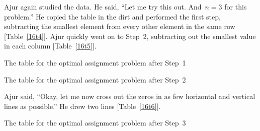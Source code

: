 Ajur again studied the data. He said, ``Let me try this out. And~$n=3$ for this problem.'' He copied the table in the dirt and performed the first step, subtracting the smallest element from every other element in the same row [Table~\ref{16t4}].
Ajur quickly went on to Step~2, subtracting out the smallest value in each column [Table~\ref{16t5}].

\begin{table}
\begin{center}

\caption{The table for the optimal assignment problem after Step~1}\label{16t4}
\end{center}
\end{table}

\begin{table}
\begin{center}

\caption{The table for the optimal assignment problem after Step~2}\label{16t5}
\end{center}
\end{table}

Ajur said, ``Okay, let me now cross out the zeros in as few horizontal and vertical lines as possible.'' He drew two lines [Table~\ref{16t6}].

\begin{table}
\begin{center}

\caption{The table for the optimal assignment problem after Step~3}\label{16t6}
\end{center}
\end{table}

